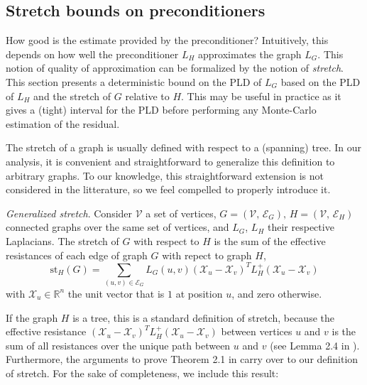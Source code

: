 

\subsection{Stretch bounds on preconditioners\label{sub:Stretch-bounds}}

How good is the estimate provided by the preconditioner? Intuitively,
this depends on how well the preconditioner $L_{H}$ approximates
the graph $L_{G}$. This notion of quality of approximation can be
formalized by the notion of \emph{stretch}. This section presents
a deterministic bound on the PLD of $L_{G}$ based on the PLD of $L_{H}$
and the stretch of $G$ relative to $H$. This may be useful in practice
as it gives a (tight) interval for the PLD before performing any Monte-Carlo
estimation of the residual.

The stretch of a graph is usually defined with respect to a (spanning)
tree. In our analysis, it is convenient and straightforward to generalize
this definition to arbitrary graphs. To our knowledge, this straightforward
extension is not considered in the litterature, so we feel compelled
to properly introduce it.

\begin{definition}\emph{Generalized stretch}.\label{Generalized-stretch}
Consider $\mathcal{V}$ a set of vertices, $G=\left(\mathcal{V},\,\mathcal{E}_{G}\right),\, H=\left(\mathcal{V},\,\mathcal{E}_{H}\right)$
connected graphs over the same set of vertices, and $L_{G}$, $L_{H}$
their respective Laplacians. The stretch of $G$ with respect to $H$
is the sum of the effective resistances of each edge of graph $G$
with repect to graph $H$, 
\[
\text{st}_{H}\left(G\right)=\sum_{\left(u,v\right)\in\mathcal{E}_{G}}L_{G}\left(u,v\right)\left(\mathcal{X}_{u}-\mathcal{X}_{v}\right)^{T}L_{H}^{+}\left(\mathcal{X}_{u}-\mathcal{X}_{v}\right)
\]
with $\mathcal{X}_{u}\in\mathbb{R}^{n}$ the unit vector that is $1$
at position $u$, and zero otherwise.

\end{definition}

If the graph $H$ is a tree, this is a standard definition of stretch,
because the effective resistance $\left(\mathcal{X}_{u}-\mathcal{X}_{v}\right)^{T}L_{H}^{+}\left(\mathcal{X}_{u}-\mathcal{X}_{v}\right)$
between vertices $u$ and $v$ is the sum of all resistances over
the unique path between $u$ and $v$ (see Lemma 2.4 in \cite{Spielman2009b}).
Furthermore, the arguments to prove Theorem 2.1 in \cite{Spielman2009b}
carry over to our definition of stretch. For the sake of completeness,
we include this result:

